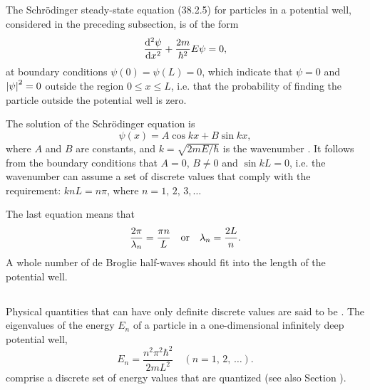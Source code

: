 \subsection{}\label{38.4.2} The Schr\"odinger steady-state
equation (38.2.5) for particles in a potential well, considered in the preceding subsection, is of the form
\begin{equation*}%
\dv[2]{\psi}{x} + \frac{2m}{\hbar^{2}} E \psi = 0,
\end{equation*}
at boundary conditions $\psi (0) = \psi (L) = 0$, which indicate that $\psi = 0$ and $\abs{\psi}^{2} = 0$ outside the region $0 \leqslant x \leqslant L$, i.e. that the probability of finding the particle outside the potential well is zero.

The solution of the Schr\"odinger equation is
\begin{equation*}%
\psi(x) = A \cos k x  + B \sin kx,
\end{equation*}
where $A$ and $B$ are constants, and $k = \sqrt{2mE/\hbar}$ is the wavenumber . It follows from the boundary conditions that $A = 0$, $B \neq 0$ and $\sin kL = 0$, i.e. the wavenumber can assume a set of discrete values that comply with the requirement: $knL = n \pi$, where $n = 1, \,2, \,3, \ldots{}$

The last equation means that
\begin{equation*}%
\frac{2\pi}{\lambda_{n}} = \frac{\pi n}{L} \qor \lambda_{n} = \frac{2L}{n}. 
\end{equation*}
A whole number of de Broglie half-waves should fit into the length of the potential well.

\subsection{}\label{38.4.3} Physical quantities that can have only definite discrete values are said to be . The eigenvalues of the energy $E_{n}$ of a particle in a one-dimensional infinitely deep potential well,
\begin{equation*}%
E_{n} = \frac{n^{2}\pi^{2} \hbar^{2}}{2mL^{2}} \quad (n = 1,\, 2, \, \ldots{}). 
\end{equation*}
comprise a discrete set of energy values that are quantized (see also Section ).

